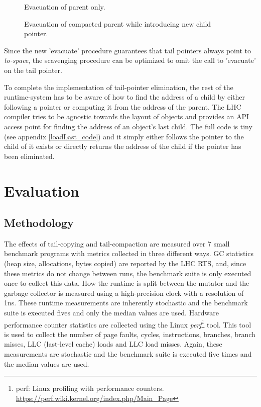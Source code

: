\documentclass[a4paper,oneside]{memoir}
\begin{document}
\begin{figure}[b]
  
  \caption{Evacuation of parent only.}
  \label{multiple_parents}
\end{figure}


\begin{figure}
  
  \caption{Evacuation of compacted parent while introducing new child pointer.}
  \label{parent_no_child}
\end{figure}

Since the new 'evacuate' procedure guarantees that tail pointers always point
to \emph{to-space}, the scavenging procedure can be optimized to omit the
call to 'evacuate' on the tail pointer.

To complete the implementation of tail-pointer elimination, the rest of the
runtime-system has to be aware of how to find the address of a child by either
following a pointer or computing it from the address of the parent. The LHC
compiler tries to be agnostic towards the layout of objects and provides
an API access point for finding the address of an object's last child. The full
code is tiny (see appendix \ref{loadLast_code}) and it simply either follows the
pointer to the child of it exists or directly returns the address of the child
if the pointer has been eliminated.



\chapter{Evaluation}

\section{Methodology}
The effects of tail-copying and tail-compaction are measured over 7 small
benchmark programs with metrics collected in three different ways.
GC statistics (heap size, allocations, bytes copied) are reported by the LHC RTS,
and, since these metrics do not change between runs, the benchmark suite is only
executed once to collect this data.
How the runtime is split between the mutator and the garbage collector is
measured using a high-precision clock with a resolution of 1ns. These runtime
measurements are inherently stochastic and the benchmark suite is executed
fives and only the median values are used.
Hardware performance counter statistics are collected using the Linux
\emph{perf}\footnote{perf: Linux profiling with performance counters. \url{https://perf.wiki.kernel.org/index.php/Main_Page}}
tool. This tool is used to collect the number of page faults, cycles, instructions,
branches, branch misses, LLC (last-level cache) loads and LLC load misses. Again,
these measurements are stochastic and the benchmark suite is executed five times
and the median values are used.
\end{document}
